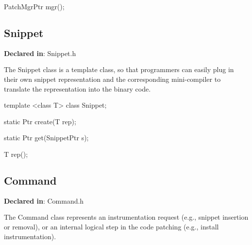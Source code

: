 \begin{apient}
PatchMgrPtr mgr();
\end{apient}



\subsection{Snippet}
\label{sec-3.2.2}

\textbf{Declared in}: Snippet.h

The Snippet class is a template class, so that programmers can easily plug in
their own snippet representation and the corresponding mini-compiler to
translate the representation into the binary code.


\begin{apient}
template <class T>
class Snippet;

\end{apient}



\begin{apient}
static Ptr create(T rep);
\end{apient}



\begin{apient}
static Ptr get(SnippetPtr s);
\end{apient}



\begin{apient}
T rep();
\end{apient}



\subsection{Command}
\label{sec-3.2.3}

\textbf{Declared in}: Command.h

The Command class represents an instrumentation request (e.g., snippet insertion
or removal), or an internal logical step in the code patching (e.g., install
instrumentation).


